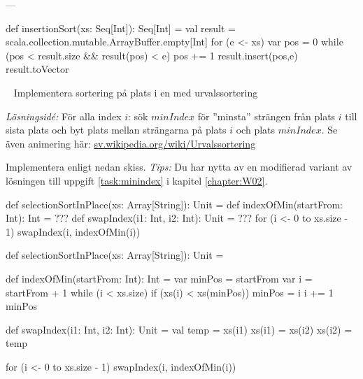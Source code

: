 \TaskSolved \what


\SubtaskSolved ---

\SubtaskSolved

\begin{Code}
def insertionSort(xs: Seq[Int]): Seq[Int] = {
  val result = scala.collection.mutable.ArrayBuffer.empty[Int]
  for (e <- xs) {
    var pos = 0
    while (pos < result.size && result(pos) < e) pos += 1
    result.insert(pos,e)
  }
  result.toVector
}
\end{Code}

\QUESTEND






\QUESTBEGIN

\Task  \what~ Implementera sortering på plats  i en  med urvalssortering 

\emph{Lösningsidé:} För alla index $i$: sök $minIndex$ för ''minsta'' strängen från plats $i$ till sista plats och byt plats mellan strängarna på plats $i$ och plats $minIndex$. Se även animering här: \href{https://sv.wikipedia.org/wiki/Urvalssortering}{sv.wikipedia.org/wiki/Urvalssortering}

Implementera enligt nedan skiss.  \emph{Tips:} Du har nytta av en modifierad variant av lösningen till uppgift \ref{task:minindex} i kapitel \ref{chapter:W02}.
\begin{Code}
def selectionSortInPlace(xs: Array[String]): Unit = {
  def indexOfMin(startFrom: Int): Int = ???
  def swapIndex(i1: Int, i2: Int): Unit = ???
  for (i <- 0 to xs.size - 1) swapIndex(i, indexOfMin(i))
}
\end{Code}




\SOLUTION


\TaskSolved \what


\begin{Code}
def selectionSortInPlace(xs: Array[String]): Unit = {

  def indexOfMin(startFrom: Int): Int = {
    var minPos = startFrom
    var i = startFrom + 1
    while (i < xs.size) {
      if (xs(i) < xs(minPos)) minPos = i
      i += 1
    }
    minPos
  }

  def swapIndex(i1: Int, i2: Int): Unit = {
    val temp = xs(i1)
    xs(i1) = xs(i2)
    xs(i2) = temp
  }

  for (i <- 0 to xs.size - 1) swapIndex(i, indexOfMin(i))
}
\end{Code}


